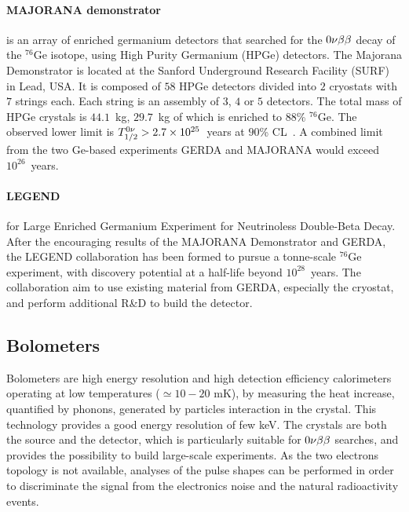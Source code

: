 \paragraph{MAJORANA demonstrator} is an array of enriched germanium detectors that searched for the $0\nu\beta\beta$ decay of the $^{76}$Ge isotope, using High Purity Germanium (HPGe) detectors.
The Majorana Demonstrator is located at the Sanford Underground Research Facility (SURF) in Lead, USA.
It is composed of $58$ HPGe detectors divided into $2$ cryostats with $7$ strings each.
Each string is an assembly of $3$, $4$ or $5$ detectors.
The total mass of HPGe crystals is $44.1$~kg, $29.7$~kg of which is enriched to $88$\% $^{76}$Ge.
The observed lower limit is $T_{1/2}^{0\nu}>2.7\times 10^{25}$~years at $90$\% CL~\cite{art:majorana2019}.
A combined limit from the two Ge-based experiments GERDA and MAJORANA would exceed $10^{26}$~years.

\paragraph{LEGEND} for Large Enriched Germanium Experiment for Neutrinoless Double-Beta Decay.
After the encouraging results of the MAJORANA Demonstrator and GERDA, the LEGEND collaboration has been formed to pursue a tonne-scale $^{76}$Ge experiment, with discovery potential at a half-life beyond $10^{28}$~years.
The collaboration aim to use existing material from GERDA, especially the cryostat, and perform additional R\&D to build the detector.

\subsection{Bolometers}
\label{subsec:bolometers}

Bolometers are high energy resolution and high detection efficiency calorimeters operating at low temperatures ($\simeq 10-20$ mK), by measuring the heat increase, quantified by phonons, generated by particles interaction in the crystal.
This technology provides a good energy resolution of few keV.
The crystals are both the source and the detector, which is particularly suitable for $0\nu\beta\beta$ searches, and provides the possibility to build large-scale experiments.
As the two electrons topology is not available, analyses of the pulse shapes can be performed in order to discriminate the signal from the electronics noise and the natural radioactivity events.

